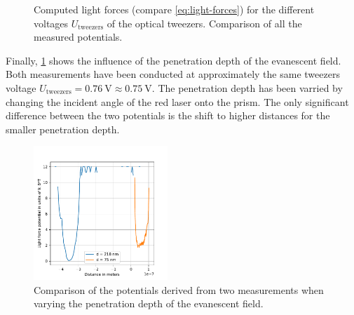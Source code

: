 \documentclass[../bericht.tex]{subfiles}
\begin{document}
      \begin{figure}[tb]
        \centering
        \hfill
        \caption{\protect{} Computed light forces (compare \cref{eq:light-forces}) for the different voltages $U_\mathrm{tweezers}$ of the optical tweezers. \protect{} Comparison of all the measured potentials.}
      \end{figure}

      Finally, \cref{fig:two-blocks} shows the influence of the penetration depth of the evanescent field. Both measurements have been conducted at approximately the same tweezers voltage $U_\mathrm{tweezers}=\SI{0,76}{\volt}\approx \SI{0,75}{\volt}$. The penetration depth has been varried by changing the incident angle of the red laser onto the prism. The only significant difference between the two potentials is the shift to higher distances for the smaller penetration depth.

      \begin{figure}[tbh]
        \centering
        \includegraphics[width=0.45\textwidth]{figures/potentials12.pdf}
        \caption{Comparison of the potentials derived from two measurements when varying the penetration depth of the evanescent field.}
        \label{fig:two-blocks}
      \end{figure}
\end{document}
